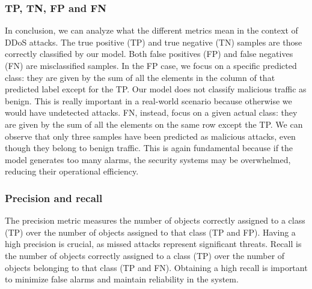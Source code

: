\documentclass[acmlarge,nonacm]{acmart}
\begin{document}
\subsubsection{TP, TN, FP and FN} 
In conclusion, we can analyze what the different metrics mean in the context of DDoS attacks. The true positive (TP) and true negative (TN) samples are those correctly classified by our model. Both false positives (FP) and false negatives (FN) are misclassified samples. In the FP case, we focus on a specific predicted class: they are given by the sum of all the elements in the column of that predicted label except for the TP. Our model does not classify malicious traffic as benign. This is really important in a real-world scenario because otherwise we would have undetected attacks. FN, instead, focus on a given actual class: they are given by the sum of all the elements on the same row except the TP. We can observe that only three samples have been predicted as malicious attacks, even though they belong to benign traffic. This is again fundamental because if the model generates too many alarms, the security systems may be overwhelmed, reducing their operational efficiency. 
\subsubsection{Precision and recall} 
The precision metric measures the number of objects correctly assigned to a class (TP) over the number of objects assigned to that class (TP and FP). Having a high precision is crucial, as missed attacks represent significant threats. Recall is the number of objects correctly assigned to a class (TP) over the number of objects belonging to that class (TP and FN). Obtaining a high recall is important to minimize false alarms and maintain reliability in the system. 
\end{document}
